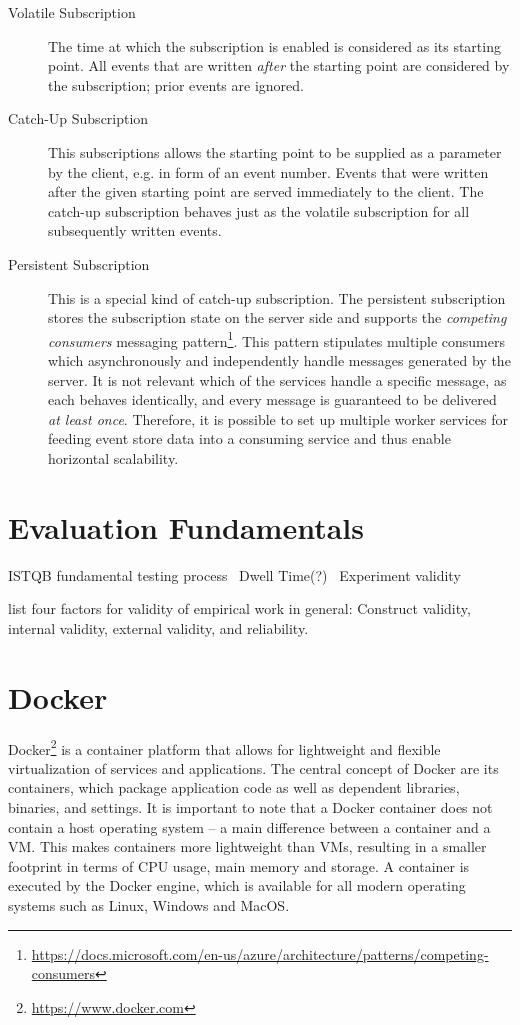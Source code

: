 \begin{description}
\item[Volatile Subscription]
The time at which the subscription is enabled is considered as its starting point.
All events that are written \emph{after} the starting point are considered by the subscription; prior events are ignored.
\item[Catch-Up Subscription]
This subscriptions allows the starting point to be supplied as a parameter by the client, e.g. in form of an event number.
Events that were written after the given starting point are served immediately to the client.
The catch-up subscription behaves just as the volatile subscription for all subsequently written events.
\item[Persistent Subscription] 
This is a special kind of catch-up subscription.
The persistent subscription stores the subscription state on the server side and supports the \emph{competing consumers} messaging pattern\footnote{\url{https://docs.microsoft.com/en-us/azure/architecture/patterns/competing-consumers}}.
This pattern stipulates multiple consumers which asynchronously and independently handle messages generated by the server.
It is not relevant which of the services handle a specific message, as each behaves identically, and every message is guaranteed to be delivered \emph{at least once}.
Therefore, it is possible to set up multiple worker services for feeding event store data into a consuming service and thus enable horizontal scalability.
\end{description}

\section{Evaluation Fundamentals}
\label{sec:fundamentals:evaluation}

ISTQB fundamental testing process~\cite{graham2008foundations}
Dwell Time(?)~\cite{Liu2010}\cite{Kim2014}
Experiment validity

\citet{Easterbrook2008a} list four factors for validity of empirical work in general: Construct validity, internal validity, external validity, and reliability.


\section{Docker}
\label{sec:fundamentals:docker}

Docker\footnote{\url{https://www.docker.com}} is a container platform that allows for lightweight and flexible virtualization of services and applications.
The central concept of Docker are its containers, which package application code as well as dependent libraries, binaries, and settings.
It is important to note that a Docker container does not contain a host operating system -- a main difference between a container and a \ac{VM}.
This makes containers more lightweight than \ac{VM}s, resulting in a smaller footprint in terms of CPU usage, main memory and storage.
A container is executed by the Docker engine, which is available for all modern operating systems such as Linux, Windows and MacOS.

